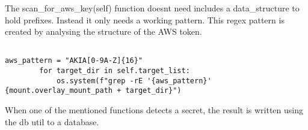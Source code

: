 The scan\_for\_aws\_key(self) function doesnt need includes a data\_structure to hold prefixes. Instead it only needs a working pattern.
This regex pattern is created by analysing the structure of the AWS token.	

\lstset{language=Python}          %
\begin{lstlisting}[]  % Start your code-block
	
aws_pattern = "AKIA[0-9A-Z]{16}"
        for target_dir in self.target_list:
            os.system(f"grep -rE '{aws_pattern}' {mount.overlay_mount_path + target_dir}")
\end{lstlisting}

When one of the mentioned functions detects a secret, the result is written using the db util to a database.



